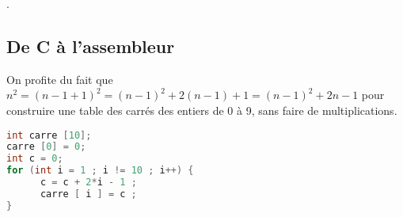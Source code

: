 


.


\subsection{De C à l'assembleur}
On profite du fait que $n^2 = (n-1 + 1)^2 = (n-1)^2 + 2(n-1) + 1 
= (n-1)^2 + 2n - 1$
pour construire une table des carrés des entiers de 0 à 9, 
sans faire de multiplications.
 
\begin{lstlisting}[language=C]
int carre [10];
carre [0] = 0;
int c = 0;
for (int i = 1 ; i != 10 ; i++) {
      c = c + 2*i - 1 ; 
      carre [ i ] = c ;
}
\end{lstlisting}


